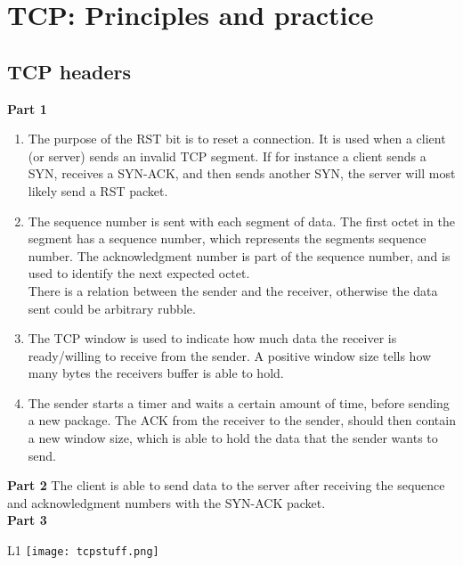 \section{TCP: Principles and practice}
\subsection{TCP headers}
\textbf{Part 1}\\
\begin{enumerate}
\item The purpose of the RST bit is to reset a connection. It is used
  when a client (or server) sends an invalid TCP segment. If for instance a
  client sends a SYN, receives a SYN-ACK, and then sends another SYN, the server
  will most likely send a RST packet.
\item The sequence number is sent with each segment of data. The first octet in
  the segment has a sequence number, which represents the segments sequence
  number. The acknowledgment number is part of the sequence number, and is used
  to identify the next expected octet.\\
  There is a relation between the sender and the receiver, otherwise the data
  sent could be arbitrary rubble.
\item The TCP window is used to indicate how much data the receiver is
  ready/willing to receive from the sender. A positive window size tells how
  many bytes the receivers buffer is able to hold.
\item The sender starts a timer and waits a certain amount of time, before
  sending a new package. The ACK from the receiver to the sender, should then
  contain a new window size, which is able to hold the data that the sender
  wants to send.
\end{enumerate}

\noindent \textbf{Part 2}
The client is able to send data to the server after receiving the sequence and
acknowledgment numbers with the SYN-ACK packet.\\

\noindent \textbf{Part 3}
\begin{wrapfigure}{L}{1\textwidth}
  \texttt{[image: tcpstuff.png]}
\end{wrapfigure}

